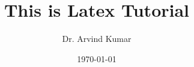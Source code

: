 \documentclass{book}
\begin{document}
	\title{This is Latex Tutorial}
	\author{Dr. Arvind Kumar}
	\date{\today}
	\maketitle
\end{document}
